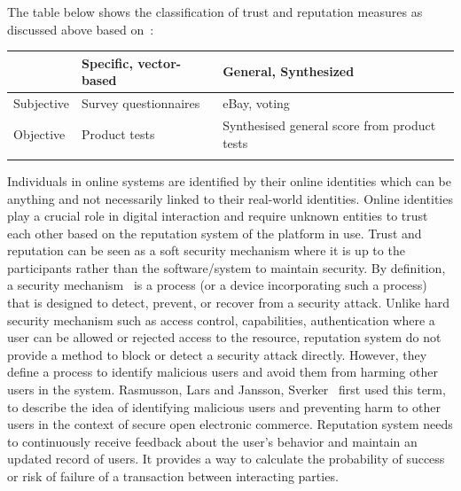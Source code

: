 The table below shows the classification of trust and reputation measures as
discussed above based on~\cite{ josang2007survey}: 
 \begin{center}\label{table:classificationTrust}
	\begin{tabularx}{\textwidth }{|X| X| X| }
		\hline
		 & Specific, vector-based & General, Synthesized \\
		 \hline
		Subjective & Survey questionnaires & eBay, voting \\
		\hline
		Objective & Product tests & Synthesised general score from product tests \\
		\hline
		\caption{Classification of trust and reputation measures.} 
	\end{tabularx}
\end{center}
\vspace{-15mm}
Individuals in online systems are identified by their online identities which
can be anything and not necessarily linked to their real-world identities.
Online identities play a crucial role in digital interaction and require
unknown entities to trust each other based on the reputation system of the
platform in use. Trust and reputation can be seen as a soft security mechanism
where it is up to the participants rather than the software/system to maintain
security. By definition, a security mechanism~\cite{stallings2017cryptography}
is a process (or a device incorporating such a process) that is designed to
detect, prevent, or recover from a security attack. Unlike hard security
mechanism such as access control, capabilities, authentication where a user can
be allowed or rejected access to the resource, reputation system do not provide
a method to block or detect a security attack directly. However, they define a
process to identify malicious users and avoid them from harming other users in
the system. Rasmusson, Lars and Jansson, Sverker~\cite{rasmusson1996simulated}
first used this term, to describe the idea of identifying malicious users and
preventing harm to other users in the context of secure open electronic
commerce. Reputation system needs to continuously receive feedback about the
user's behavior and maintain an updated record of users. It provides a way to
calculate the probability of success or risk of failure of a transaction
between interacting parties. 
